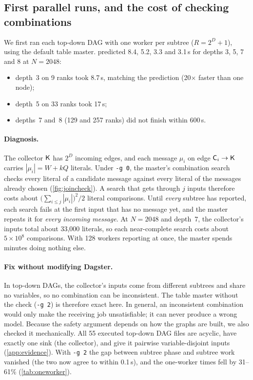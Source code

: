 \documentclass[11pt,a4paper]{article}
\newcommand{\opt}[1]{\texttt{#1}}
\begin{document}
\subsection{First parallel runs, and the cost of checking combinations}
\label{sec:joincheck}
We first ran each top-down DAG with one worker per subtree ($R=2^D+1$), using the default
table master.  predicted 8.4, 5.2, 3.3 and 3.1\,s for depths 3, 5, 7 and 8
at $N=2048$:
\begin{itemize}
\item depth~3 on 9 ranks took 8.7\,s, matching the prediction (20$\times$ faster than one
      node);
\item depth~5 on 33 ranks took 17\,s;
\item depths~7 and~8 (129 and 257 ranks) did not finish within 600\,s.
\end{itemize}

\paragraph{Diagnosis.}
The collector $\mathsf{K}$ has $2^D$ incoming edges, and each message $\mu_i$ on edge $\mathsf{C}_i\to\mathsf{K}$
carries $|\mu_i|=W+kQ$ literals. Under \opt{-g 0}, the master's combination search checks
every literal of a candidate message against every literal of the messages already chosen
(\cref{fig:joincheck}). A search that gets through $j$ inputs therefore costs about
$\bigl(\sum_{i\le j}|\mu_i|\bigr)^2/2$ literal comparisons. Until \emph{every} subtree has
reported, each search fails at the first input that has no message yet, and the master
repeats it for \emph{every incoming message}. At $N=2048$ and depth~7, the collector's
inputs total about 33{,}000 literals, so each near-complete search costs about $5\times10^8$
comparisons. With 128 workers reporting at once, the master spends minutes doing nothing
else.

\paragraph{Fix without modifying Dagster.}
In top-down DAGs, the collector's inputs come from different subtrees and share no
variables, so no combination can be inconsistent. The table master without the check
(\opt{-g 2}) is therefore exact here. In general, an inconsistent combination would only
make the receiving job unsatisfiable; it can never produce a wrong model. Because the safety
argument depends on how the graphs are built, we also checked it mechanically. All 55
executed top-down DAG files are acyclic, have exactly one sink (the collector), and give it
pairwise variable-disjoint inputs (\cref{app:evidence}). With \opt{-g 2}
the gap between subtree phase and subtree work vanished (the two now agree to within
0.1\,s), and the one-worker times fell by 31--61\% (\cref{tab:oneworker}).
\end{document}

